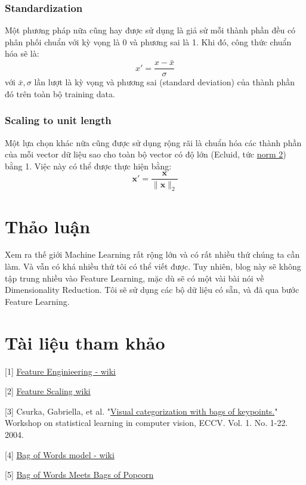  
\subsubsection{Standardization }
Một phương pháp nữa cũng hay được sử dụng là giả sử mỗi thành phần đều có phân phối chuẩn với kỳ vọng là 0 và phương sai là 1. Khi đó, công thức chuẩn hóa sẽ là:  
\begin{equation*} 
x' = \frac{x - \bar{x}}{\sigma} 
\end{equation*} 
với $\bar{x}, \sigma$ lần lượt là kỳ vọng và phương sai (standard deviation) của thành phần đó trên toàn bộ training data.  
 
\subsubsection{Scaling to unit length }
Một lựa chọn khác nữa cũng được sử dụng rộng rãi là chuẩn hóa các thành phần của mỗi vector dữ liệu sao cho toàn bộ vector có độ lớn (Ecluid, tức \href{http://machinelearningcoban.com/math/#norm2}{norm 2}) bằng 1. Việc này có thể được thực hiện bằng: 
\begin{equation*} 
\mathbf{x}' = \frac{\mathbf{x}}{\|\mathbf{x}\|_2} 
\end{equation*} 
 
 
\section{Thảo luận}
Xem ra thế giới Machine Learning rất rộng lớn và có rất nhiều thứ chúng ta cần làm. Và 
vẫn có khá nhiều thứ tôi có thể viết được. Tuy nhiên, blog này sẽ không tập trung nhiều vào Feature Learning, mặc dù sẽ có một vài bài nói về Dimensionality Reduction. Tôi sẽ sử dụng các bộ dữ liệu có sẵn, và đã qua bước Feature Learning.  
 
 
\section{Tài liệu tham khảo }
[1] \href{https://en.wikipedia.org/wiki/Feature_engineering}{Feature Enginieering - wiki} 

[2] \href{https://en.wikipedia.org/wiki/Feature_scaling}{Feature Scaling wiki} 

[3] Csurka, Gabriella, et al. "\href{https://people.eecs.berkeley.edu/~efros/courses/AP06/Papers/csurka-eccv-04.pdf}{Visual categorization with bags of keypoints.}" Workshop on statistical learning in computer vision, ECCV. Vol. 1. No. 1-22. 2004.  

[4] \href{https://en.wikipedia.org/wiki/Bag-of-words_model}{Bag of Words model - wiki} 

[5] \href{https://www.kaggle.com/c/word2vec-nlp-tutorial/details/part-1-for-beginners-bag-of-words}{Bag of Words Meets Bags of Popcorn} 
 

